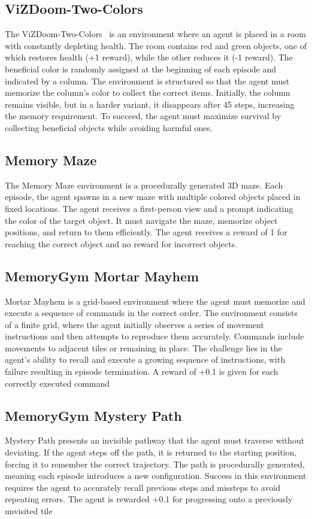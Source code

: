 \subsection{ViZDoom-Two-Colors}

The ViZDoom-Two-Colors~\citep{sorokin2022explain} is an environment where an agent is placed in a room with constantly depleting health. The room contains red and green objects, one of which restores health (+1 reward), while the other reduces it (-1 reward). The beneficial color is randomly assigned at the beginning of each episode and indicated by a column. The environment is structured so that the agent must memorize the column’s color to collect the correct items. Initially, the column remains visible, but in a harder variant, it disappears after 45 steps, increasing the memory requirement. To succeed, the agent must maximize survival by collecting beneficial objects while avoiding harmful ones.

\subsection{Memory Maze}

The Memory Maze environment \cite{memory_maze} is a procedurally generated 3D maze. Each episode, the agent spawns in a new maze with multiple colored objects placed in fixed locations. The agent receives a first-person view and a prompt indicating the color of the target object. It must navigate the maze, memorize object positions, and return to them efficiently. The agent receives a reward of 1 for reaching the correct object and no reward for incorrect objects.



\subsection{MemoryGym Mortar Mayhem}
Mortar Mayhem \citep{pleines2023memory} is a grid-based environment where the agent must memorize and execute a sequence of commands in the correct order. The environment consists of a finite grid, where the agent initially observes a series of movement instructions and then attempts to reproduce them accurately. Commands include movements to adjacent tiles or remaining in place. The challenge lies in the agent's ability to recall and execute a growing sequence of instructions, with failure resulting in episode termination. A reward of +0.1 is given for each correctly executed command

\subsection{MemoryGym Mystery Path}
Mystery Path \citep{pleines2023memory} presents an invisible pathway that the agent must traverse without deviating. If the agent steps off the path, it is returned to the starting position, forcing it to remember the correct trajectory. The path is procedurally generated, meaning each episode introduces a new configuration. Success in this environment requires the agent to accurately recall previous steps and missteps to avoid repeating errors. The agent is rewarded +0.1 for progressing onto a previously unvisited tile


